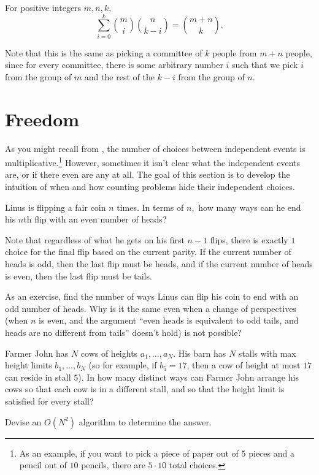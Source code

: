 \begin{theo}[Vandermonde]
For positive integers $m,n,k,$
\[\sum_{i=0}^k\binom {m}{i}\binom {n}{k-i}=\binom{m+n}{k}.\]
\end{theo}

\begin{pro}
Note that this is the same as picking a committee of $k$ people from $m+n$ people, since for every committee, there is some arbitrary number $i$ such that we pick $i$ from the group of $m$ and the rest of the $k-i$ from the group of $n.$
\end{pro}

\section{Freedom}

As you might recall from , the number of choices between independent events is multiplicative.\footnote{As an example, if you want to pick a piece of paper out of $5$ pieces and a pencil out of $10$ pencils, there are $5\cdot 10$ total choices.} However, sometimes it isn't clear what the independent events are, or if there even are any at all. The goal of this section is to develop the intuition of when and how counting problems hide their independent choices.

\begin{exam}[Coins]
Linus is flipping a fair coin $n$ times. In terms of $n,$ how many ways can he end his $n$th flip with an even number of heads?
\end{exam}

\begin{sol}
Note that regardless of what he gets on his first $n-1$ flips, there is exactly $1$ choice for the final flip based on the current parity. If the current number of heads is odd, then the last flip must be heads, and if the current number of heads is even, then the last flip must be tails.
\end{sol}

As an exercise, find the number of ways Linus can flip his coin to end with an odd number of heads. Why is it the same even when a change of perspectives (when $n$ is even, and the argument ``even heads is equivalent to odd tails, and heads are no different from tails'' doesn't hold) is not possible?


\begin{exam}
Farmer John has $N$ cows of heights $a_1,\ldots,a_N.$ His barn has $N$ stalls with max height limits $b_1,\ldots,b_N$ (so for example, if $b_5=17$, then a cow of height at most $17$ can reside in stall $5$). In how many distinct ways can Farmer John arrange his cows so that each cow is in a different stall, and so that the height limit is satisfied for every stall? 

Devise an $O(N^2)$ algorithm to determine the answer.
\end{exam}

